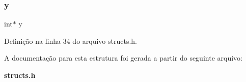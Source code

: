 \mbox{\label{structpolygons__p_a60ca3f7e128ed4283d00a73c65558617}} 
\subsubsection{y}
{\footnotesize\ttfamily int$\ast$ y}



Definição na linha 34 do arquivo structs.\+h.



A documentação para esta estrutura foi gerada a partir do seguinte arquivo\+:\begin{DoxyCompactItemize}
\item 
\textbf{ structs.\+h}\end{DoxyCompactItemize}

